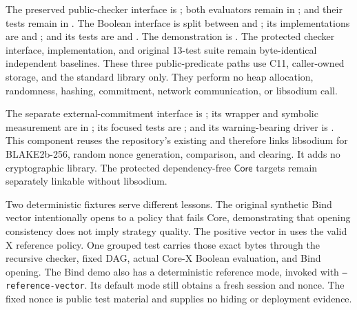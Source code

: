 \begin{sloppypar}
The preserved public-checker interface is ; both
evaluators remain in ; and their tests remain in
. The Boolean interface is split between
 and
; its implementations are
 and
; and its tests are
 and
. The demonstration is
. The protected
checker interface, implementation, and original 13-test suite remain
byte-identical independent baselines. These three public-predicate paths use C11,
caller-owned storage, and the standard library only. They perform no heap
allocation, randomness, hashing, commitment, network communication, or
libsodium call.
\end{sloppypar}

\begin{sloppypar}
The separate external-commitment interface is
; its wrapper and symbolic measurement are in
; its focused tests are
; and its warning-bearing driver is
.
This component reuses the repository's existing
 and therefore links libsodium for
BLAKE2b-256, random nonce generation, comparison, and clearing. It adds no
cryptographic library. The protected dependency-free \(\mathsf{Core}\)
targets remain separately linkable without libsodium.
\end{sloppypar}

Two deterministic fixtures serve different lessons. The original synthetic
Bind vector intentionally opens to a policy that fails Core, demonstrating
that opening consistency does not imply strategy quality. The positive vector
in  uses the valid X reference
policy. One grouped test carries those exact bytes through the recursive
checker, fixed DAG, actual Core-X Boolean evaluation, and Bind opening. The
Bind demo also has a deterministic reference mode, invoked with
\texttt{--reference-vector}. Its default mode still obtains a fresh session
and nonce. The fixed nonce is
public test material and supplies no hiding or deployment evidence.

